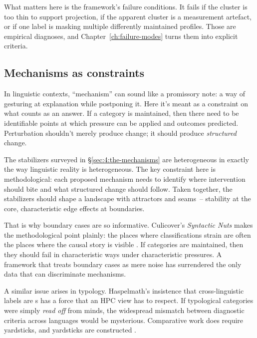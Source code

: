 What matters here is the framework's failure conditions. It fails if the cluster is too thin to support projection, if the apparent cluster is a measurement artefact, or if one label is masking multiple differently maintained profiles. Those are empirical diagnoses, and Chapter~\ref{ch:failure-modes} turns them into explicit criteria.

\subsection{Mechanisms as constraints}
\label{subsec:4:mechanisms-not-metaphors}

In linguistic contexts, \enquote{mechanism} can sound like a promissory note: a way of gesturing at explanation while postponing it. Here it's meant as a constraint on what counts as an answer. If a category is maintained, then there need to be identifiable points at which pressure can be applied and outcomes predicted. Perturbation shouldn't merely produce change; it should produce \emph{structured} change.

The stabilizers surveyed in §\ref{sec:4:the-mechanisms} are heterogeneous in exactly the way linguistic reality is heterogeneous. The key constraint here is methodological: each proposed mechanism needs to identify where intervention should bite and what structured change should follow. Taken together, the stabilizers should shape a landscape with attractors and seams~-- stability at the core, characteristic edge effects at boundaries.

That is why boundary cases are so informative. Culicover's \textit{Syntactic Nuts} makes the methodological point plainly: the places where classifications strain are often the places where the causal story is visible \autocite*{culicover1999}. If categories are maintained, then they should fail in characteristic ways under characteristic pressures. A framework that treats boundary cases as mere noise has surrendered the only data that can discriminate mechanisms.

A similar issue arises in typology. Haspelmath's insistence that cross-linguistic labels are s has a force that an HPC view has to respect. If typological categories were simply \emph{read off} from minds, the widespread mismatch between diagnostic criteria across languages would be mysterious. Comparative work does require yardsticks, and yardsticks are constructed \citep{haspelmath2010}.

